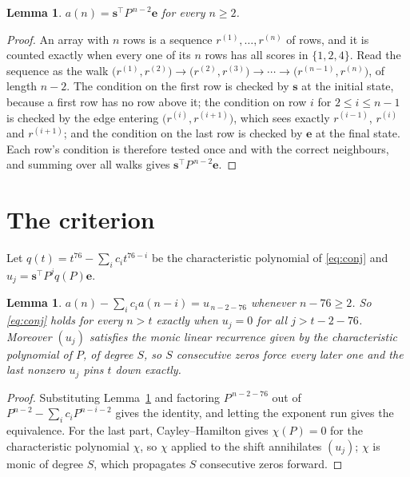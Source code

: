 \documentclass[11pt,a4paper]{article}
\theoremstyle{plain}
\newtheorem{lemma}[theorem]{Lemma}
\theoremstyle{definition}
\begin{document}
\begin{lemma}\label{lem:walk}
$a(n)=\mathbf{s}^{\!\top}P^{\,n-2}\mathbf{e}$ for every $n\ge2$.
\end{lemma}

\begin{proof}
An array with $n$ rows is a sequence $r^{(1)},\dots,r^{(n)}$ of rows, and it is counted
exactly when every one of its $n$ rows has all scores in $\{1,2,4\}$. Read the sequence as the
walk $\bigl(r^{(1)},r^{(2)}\bigr)\to\bigl(r^{(2)},r^{(3)}\bigr)\to\cdots\to
\bigl(r^{(n-1)},r^{(n)}\bigr)$, of length $n-2$. The condition on the first row is
checked by $\mathbf{s}$ at the initial state, because a first row has no row above it; the
condition on row $i$ for $2\le i\le n-1$ is checked by the edge entering
$\bigl(r^{(i)},r^{(i+1)}\bigr)$, which sees exactly $r^{(i-1)}$, $r^{(i)}$ and
$r^{(i+1)}$; and the condition on the last row is checked by $\mathbf{e}$ at the final
state. Each row's condition is therefore tested once and with the correct neighbours, and
summing over all walks gives $\mathbf{s}^{\!\top}P^{\,n-2}\mathbf{e}$.
\end{proof}

\section{The criterion}

Let $q(t)=t^{76}-\sum_i c_i t^{76-i}$ be the characteristic polynomial of
\eqref{eq:conj} and $u_j=\mathbf{s}^{\!\top}P^{j}q(P)\mathbf{e}$.

\begin{lemma}\label{lem:crit}
$a(n)-\sum_i c_i a(n-i)=u_{\,n-2-76}$ whenever $n-76\ge2$. So \eqref{eq:conj}
holds for every $n>t$ exactly when $u_j=0$ for all $j>t-2-76$. Moreover $(u_j)$
satisfies the monic linear recurrence given by the characteristic polynomial of $P$, of
degree $S$, so $S$ consecutive zeros force every later one and the last nonzero $u_j$ pins
$t$ down exactly.
\end{lemma}

\begin{proof}
Substituting Lemma~\ref{lem:walk} and factoring $P^{\,n-2-76}$ out of
$P^{n-2}-\sum_i c_i P^{n-i-2}$ gives the identity, and letting the exponent run gives the
equivalence. For the last part, Cayley--Hamilton gives $\chi(P)=0$ for the characteristic
polynomial $\chi$, so $\chi$ applied to the shift annihilates $(u_j)$; $\chi$ is monic of
degree $S$, which propagates $S$ consecutive zeros forward.
\end{proof}
\end{document}
